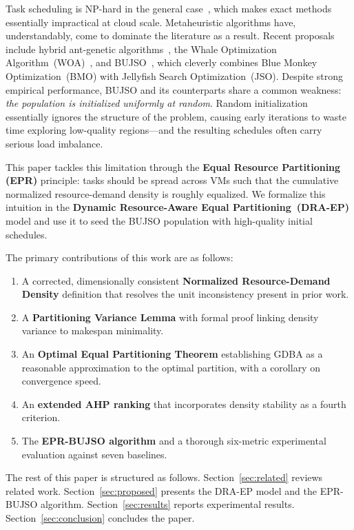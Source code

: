 \documentclass[journal]{IEEEtran}
\begin{document}
Task scheduling is NP-hard in the general case~\cite{mahmoud2022}, which makes exact methods essentially impractical at cloud scale. Metaheuristic algorithms have, understandably, come to dominate the literature as a result. Recent proposals include hybrid ant-genetic algorithms~\cite{ajmal2021}, the Whale Optimization Algorithm~(WOA)~\cite{chen2020woa}, and BUJSO~\cite{pachipala2024}, which cleverly combines Blue Monkey Optimization~(BMO) with Jellyfish Search Optimization~(JSO). Despite strong empirical performance, BUJSO and its counterparts share a common weakness: \emph{the population is initialized uniformly at random}. Random initialization essentially ignores the structure of the problem, causing early iterations to waste time exploring low-quality regions---and the resulting schedules often carry serious load imbalance.

This paper tackles this limitation through the \textbf{Equal Resource Partitioning (EPR)} principle: tasks should be spread across VMs such that the cumulative normalized resource-demand density is roughly equalized. We formalize this intuition in the \textbf{Dynamic Resource-Aware Equal Partitioning~(DRA-EP)} model and use it to seed the BUJSO population with high-quality initial schedules.

The primary contributions of this work are as follows:
\begin{enumerate}[noitemsep,topsep=2pt]
  \item A corrected, dimensionally consistent \textbf{Normalized Resource-Demand Density}
        definition that resolves the unit inconsistency present in prior work.
  \item A \textbf{Partitioning Variance Lemma} with formal proof linking density
        variance to makespan minimality.
  \item An \textbf{Optimal Equal Partitioning Theorem} establishing GDBA as a reasonable
        approximation to the optimal partition, with a corollary on convergence speed.
  \item An \textbf{extended AHP ranking} that incorporates density stability as a fourth criterion.
  \item The \textbf{EPR-BUJSO algorithm} and a thorough six-metric experimental
        evaluation against seven baselines.
\end{enumerate}

The rest of this paper is structured as follows. Section~\ref{sec:related} reviews related work. Section~\ref{sec:proposed} presents the DRA-EP model and the EPR-BUJSO algorithm. Section~\ref{sec:results} reports experimental results. Section~\ref{sec:conclusion} concludes the paper.
\end{document}
